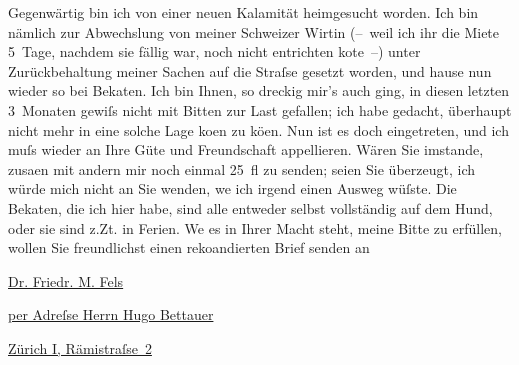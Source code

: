 \pstart
           {\pb}Gegenwärtig bin ich von einer neuen Kalamität
               heimgesucht worden. Ich bin nämlich zur Abwechslung von meiner Schweizer Wirtin (– weil ich ihr die Miete 5 Tage, nachdem sie fällig war, noch nicht
               entrichten ko{\geminationn}te –) unter Zurückbehaltung meiner Sachen
               auf die Straſse gesetzt worden, und hause nun wieder so bei Beka{\geminationn}ten. Ich bin Ihnen, so dreckig mir’s auch ging, in
               diesen letzten 3 Monaten gewiſs nicht mit Bitten zur Last gefallen; ich habe gedacht,
               überhaupt nicht mehr in eine solche Lage ko{\geminationm}en zu kö{\geminationn}en. Nun ist es doch eingetreten, und ich muſs wieder an
               Ihre Güte und Freundschaft appellieren. Wären Sie imstande, zusa{\geminationm}en mit andern mir noch einmal 25 fl zu senden; seien
               Sie überzeugt, ich würde mich nicht an Sie wenden, we{\geminationn}
               ich irgend einen Ausweg wüſste. Die Beka{\geminationn}ten, die ich
               hier habe, sind alle entweder selbst vollständig auf dem Hund, oder sie sind z.Zt. in
               Ferien. We{\geminationn} es in Ihrer Macht steht, meine Bitte zu
               erfüllen, wollen Sie freundlichst einen reko{\geminationm}andierten
               Brief senden an\pend
           
\pstart
           \centering{}\uline{Dr. Friedr. M. Fels}\pend
           
\pstart
           \centering{}\uline{per Adreſse Herrn Hugo
                     Bettauer}\pend
           
\pstart
           \raggedleft{}\uline{Zürich I, Rämistraſse 2}\pend
           

